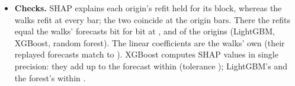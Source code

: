 \begin{itemize}
  series, a series' value and availability averages) the credit follows the trees' split choices; summing over a
  group removes the split within the group, not the split between groups.
\item \textbf{Checks.} SHAP explains each origin's refit held for its block, whereas the walks refit at every bar; the
  two coincide at the origin bars. There the refits equal the walks' forecasts bit for bit at \rhfipLgbmGateEq,
  \rhfipXgbGateEq{} and \rhfipRfGateEq{} of the \rhfipNOrigins{} origins (LightGBM, XGBoost, random forest). The
  linear coefficients are the walks' own (their replayed forecasts match to \rhfipLinGateMax). XGBoost computes SHAP
  values in single precision: they add up to the forecast within \rhfipXgbAddMax{} (tolerance \rhfipXgbAddTol);
  LightGBM's and the forest's within \rhfipAddMaxDouble.
\end{itemize}

